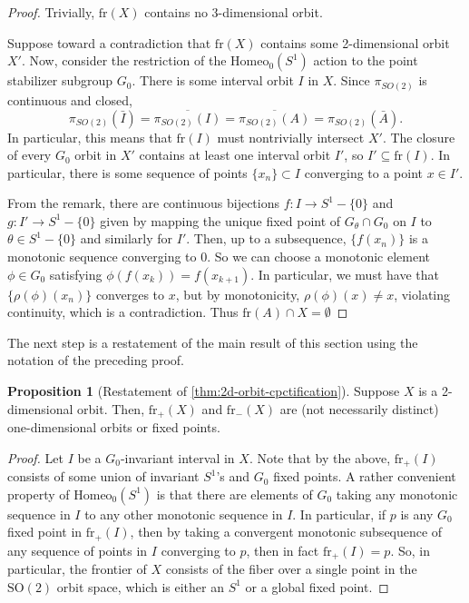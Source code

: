 \documentclass[10pt, oneside]{article}
\newcommand{\SO}[1][2]{\text{SO}(#1)}
\newcommand{\homeo}[1][S^1]{\text{Homeo}_0(#1)}
\theoremstyle{definition}
\newtheorem*{prop*}{Proposition}
\theoremstyle{definition}
\begin{document}
\begin{proof}
    Trivially, $\text{fr}(X)$ contains no 3-dimensional orbit.

    Suppose toward a contradiction that $\text{fr}(X)$ contains some 2-dimensional orbit $X'$. Now, consider the restriction of the $\homeo$ action to the point stabilizer subgroup $G_0$. There is some interval orbit $I$ in $X$. Since $\pi_{SO(2)}$ is continuous and closed, $$\pi_{SO(2)}(\bar{I}) = \overline{\pi_{SO(2)}(I)} = \overline{\pi_{SO(2)}(A)} = \pi_{SO(2)}(\bar{A}).$$ In particular, this means that $\text{fr}(I)$ must nontrivially intersect $X'$. The closure of every $G_0$ orbit in $X'$ contains at least one interval orbit $I'$, so $I'\subseteq \text{fr}(I)$. In particular, there is some sequence of points $\{x_n\}\subset I$ converging to a point $x\in I'$.

    From the remark, there are continuous bijections $f:I\to S^1-\{0\}$ and $g:I'\to S^1-\{0\}$ given by mapping the unique fixed point of $G_\theta\cap G_0$ on $I$ to $\theta\in S^1 - \{0\}$ and similarly for $I'$. Then, up to a subsequence, $\{f(x_n)\}$ is a monotonic sequence converging to 0. So we can choose a monotonic element $\phi\in G_0$ satisfying $\phi(f(x_k)) = f(x_{k+1})$. In particular, we must have that $\{\rho(\phi)( x_n)\}$ converges to $x$, but by monotonicity, $\rho(\phi)(x) \neq x$, violating continuity, which is a contradiction. Thus $\text{fr}(A)\cap X = \emptyset$
\end{proof}

The next step is a restatement of the main result of this section using the notation of the preceding proof.

\begin{prop*}[Restatement of \cref{thm:2d-orbit-cpctification}]
    Suppose $X$ is a 2-dimensional orbit. Then, $\text{fr}_+(X)$ and $\text{fr}_-(X)$ are (not necessarily distinct) one-dimensional orbits or fixed points.
\end{prop*}

\begin{proof}
     Let $I$ be a $G_0$-invariant interval in $X$. Note that by the above, $\text{fr}_+(I)$ consists of some union of invariant $S^1$'s and $G_0$ fixed points. A rather convenient property of $\homeo$ is that there are elements of $G_0$ taking any monotonic sequence in $I$ to any other monotonic sequence in $I$. In particular, if $p$ is any $G_0$ fixed point in $\text{fr}_+(I)$, then by taking a convergent monotonic subsequence of any sequence of points in $I$ converging to $p$, then in fact $\text{fr}_+(I) = p$. So, in particular, the frontier of $X$ consists of the fiber over a single point in the $\SO$ orbit space, which is either an $S^1$ or a global fixed point.
\end{proof}
\end{document}
